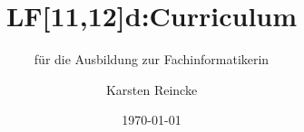 \documentclass[]{beamer}
\title{LF[11,12]d:Curriculum}
\subtitle{für die Ausbildung zur Fachinformatikerin}
\institute{GS-LDK}
\author{Karsten Reincke}
\date{\today}
\def\cfgGl{../../../cfg.gl/}
\begin{document}

\begin{frame}
  \titlepage
\end{frame}



%




\logo{}
\newpage



%
\end{document}
